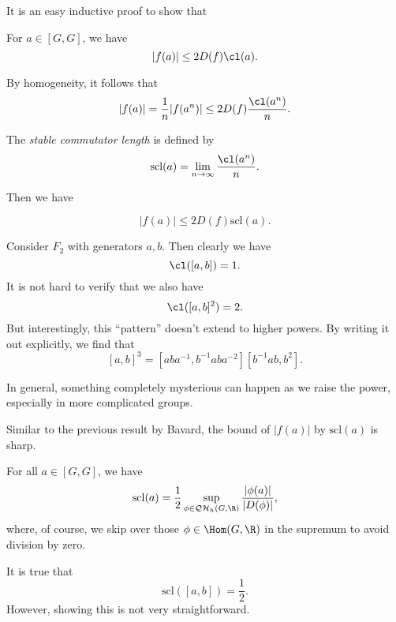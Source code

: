 \documentclass[a4paper]{article}
\newcommand\QH{\mathcal{QH}}
\newcommand\scl{\mathrm{scl}}
\newcommand\Free{F}
\begin{document}
It is an easy inductive proof to show that
\begin{lemma}
  For $a \in [G, G]$, we have
  \[
    |f(a)| \leq 2D(f) \cl(a).
  \]
\end{lemma}

By homogeneity, it follows that
\[
  |f(a)| = \frac{1}{n} |f(a^n)| \leq 2 D(f) \frac{\cl(a^n)}{n}.
\]

\begin{defi}
  The \emph{stable commutator length} is defined by
  \[
    \scl(a) = \lim_{n \to \infty} \frac{\cl(a^n)}{n}.
  \]
\end{defi}

Then we have
\begin{prop}
  \[
    |f(a)| \leq 2 D(f) \scl(a).
  \]
\end{prop}

\begin{eg}
  Consider $\Free_2$ with generators $a, b$. Then clearly we have
  \[
    \cl([a, b]) = 1.
  \]
  It is not hard to verify that we also have
  \[
    \cl([a, b]^2) = 2.
  \]
  But interestingly, this ``pattern'' doesn't extend to higher powers. By writing it out explicitly, we find that
  \[
    [a, b]^3 = [aba^{-1}, b^{-1} aba^{-2}] [b^{-1}ab, b^2].
  \]
\end{eg}
In general, something completely mysterious can happen as we raise the power, especially in more complicated groups.

Similar to the previous result by Bavard, the bound of $|f(a)|$ by $\scl(a)$ is sharp.
\begin{thm}[Bavard, 1992]
  For all $a \in [G, G]$, we have
  \[
    \scl(a) = \frac{1}{2} \sup_{\phi \in \QH_h(G, \R)} \frac{|\phi(a)|}{|D(\phi)|},
  \]
  where, of course, we skip over those $\phi \in \Hom(G, \R)$ in the supremum to avoid division by zero.
\end{thm}

\begin{eg}
  It is true that
  \[
    \scl([a, b]) = \frac{1}{2}.
  \]
  However, showing this is not very straightforward.
\end{eg}
\end{document}
